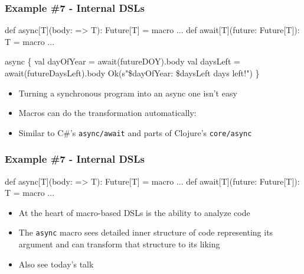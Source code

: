 \documentclass[svgnames,hyperref={bookmarks=false}]{beamer}
\begin{document}
\begin{frame}[fragile, t]
\frametitle{Example \#7 - Internal DSLs}

\begin{semiverbatim}
\alert{def async[T](body: => T): Future[T] = macro ...}
\alert{def await[T](future: Future[T]): T = macro ...}

\alert{async \{}
  val dayOfYear = \alert{await(}futureDOY\alert{)}.body
  val daysLeft = \alert{await(}futureDaysLeft\alert{)}.body
  Ok(s"\$dayOfYear: \$daysLeft days left!")
\alert{\}}



\end{semiverbatim}

\begin{itemize}
\item Turning a synchronous program into an async one isn't easy
\item Macros can do the transformation automatically: 
\item Similar to C\#'s \texttt{async/await} and parts of Clojure's \texttt{core/async}
\end{itemize}
\end{frame}

\begin{frame}[fragile]
\frametitle{Example \#7 - Internal DSLs}

\begin{semiverbatim}
\alert{def async[T](body: => T): Future[T] = macro ...}
\alert{def await[T](future: Future[T]): T = macro ...}

\end{semiverbatim}

\begin{itemize}
\item At the heart of macro-based DSLs is the ability to analyze code
\item The \texttt{async} macro sees detailed inner structure of code representing its argument and can transform that structure to its liking
\item Also see today's talk 
\end{itemize}
\end{frame}
\end{document}
